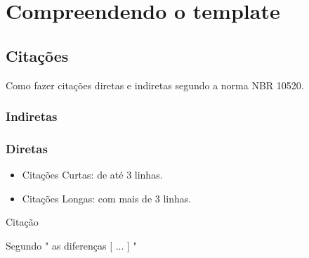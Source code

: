 

\chapter{Compreendendo o template}\label{cap:template}

\section{Citações}

Como fazer citações diretas e indiretas segundo a norma NBR 10520.

\subsection{Indiretas}

\subsection{Diretas}

\begin{itemize}
    \item Citações Curtas: de até 3 linhas.
    \item Citações Longas: com mais de 3 linhas.
\end{itemize}

Citação \cite[p. 23]{KROGH:2001}

Segundo  " as diferenças [ ... ] "

\cite{Sanches2024}
